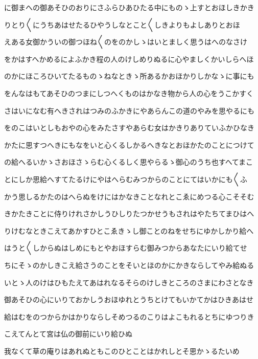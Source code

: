 \documentclass[a4paper,11pt,landscape]{ltjtarticle}
\begin{document}
\par\medskip
に御まへの御あそひのおりにさふらひあひたる中にものゝ上すとおほしきかき
\par\medskip
りとり〱にうちあはせたるひやうしなとこと〱しきよりもよしありとおほ
\par\medskip
えある女御かういの御つほね〱のをのかしゝはいとましく思うはへのなさけ
\par\medskip
をかはすへかめるによふかき程の人のけしめりぬるに心やましくかいしらへほ
\par\medskip
のかにほころひいてたるものゝねなときゝ所あるかおほかりしかなゝに事にも
\par\medskip
をんなはもてあそひのつまにしつへくものはかなき物から人の心をうこかすく
\par\medskip
さはいになむ有へきされはつみのふかきにやあらんこの道のやみを思やるにも
\par\medskip
をのこはいとしもおやの心をみたさすやあらむ女はかきりありていふかひなき
\par\medskip
かたに思すつへきにもなをいと心くるしかるへきなとおほかたのことにつけて
\par\medskip
の給へるいかゝさおほさゝらむ心くるしく思やらるゝ御心のうち也すへてまこ
\par\medskip
とにしか思給へすてたるけにやはへらむみつからのことにてはいかにも〱ふ
\par\medskip
かう思しるかたのはへらぬをけにはかなきことなれとこゑにめつる心こそそむ
\par\medskip
きかたきことに侍りけれさかしうひしりたつかせうもされはやたちてまひはへ
\par\medskip
りけむなときこえてあかすひとこゑきゝし御ことのねをせちにゆかしかり給へ
\par\medskip
はうと〱しからぬはしめにもとやおほすらむ御みつからあなたにいり給てせ
\par\medskip
ちにそゝのかしきこえ給さうのことをそいとほのかにかきならしてやみ給ぬる
\par\medskip
いとゝ人のけはひもたえてあはれなるそらのけしきところのさまにわさとなき
\par\medskip
御あそひの心にいりておかしうおほゆれとうちとけてもいかてかはひきあはせ
\par\medskip
給はむをのつからかはかりならしそめつるのこりはよこもれるとちにゆつりき
\par\medskip
こえてんとて宮は仏の御前にいり給ひぬ
\par\medskip
我なくて草の庵りはあれぬともこのひとことはかれしとそ思かゝるたいめ
\par\medskip
\end{document}
